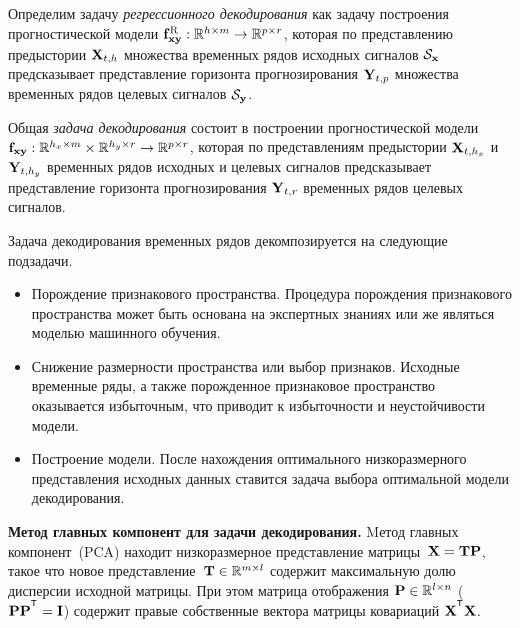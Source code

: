 \documentclass[11pt, a5paper]{dissert}
\begin{document}
\begin{definition}
	\label{ch1:def:reg_model}
	Определим задачу \textit{регрессионного декодирования} как задачу построения прогностической модели $\mathbf{f}^{\text{R}}_{\mathbf{x}\mathbf{y}}: \mathbb{R}^{h \times m} \rightarrow \mathbb{R}^{p \times r}$, которая по представлению предыстории $\mathbf{X}_{t,h}$ множества временных рядов исходных сигналов $\mathcal{S}_{\mathbf{x}}$ предсказывает представление горизонта прогнозирования $\mathbf{Y}_{t,p}$ множества временных рядов целевых сигналов $\mathcal{S}_{\mathbf{y}}$.
\end{definition}

\begin{definition}
	\label{ch1:def:decode_model}
	Общая \textit{задача декодирования} состоит в построении прогностической модели $\mathbf{f}_{\mathbf{x}\mathbf{y}}: \mathbb{R}^{h_x \times m} \times \mathbb{R}^{h_y \times r} \rightarrow \mathbb{R}^{p \times r}$, которая по представлениям предыстории $\mathbf{X}_{t,h_x}$ и $\mathbf{Y}_{t,h_y}$ временных рядов исходных и целевых сигналов предсказывает представление горизонта прогнозирования $\mathbf{Y}_{t,r}$ временных рядов целевых сигналов. 
\end{definition}

Задача декодирования временных рядов декомпозируется на следующие подзадачи.
\begin{itemize}
	\item Порождение признакового пространства.  
	Процедура порождения признакового пространства может быть основана на экспертных знаниях или же являться моделью машинного обучения. 
	
	\item Снижение размерности пространства или выбор признаков. 
	Исходные временные ряды, а также порожденное признаковое пространство оказывается избыточным, что приводит к избыточности и неустойчивости модели. 
	
	\item Построение модели.
	После нахождения оптимального низкоразмерного представления исходных данных ставится задача выбора оптимальной модели декодирования.
\end{itemize}

\vspace{0.5cm}
\textbf{Метод главных компонент для задачи декодирования.}
Mетод главных компонент~(PCA) находит низкоразмерное представление матрицы~$\mathbf{X} = \mathbf{T} \mathbf{P}$, такое что новое представление~$\mathbf{T} \in \mathbb{R}^{m \times l}$ содержит максимальную долю дисперсии исходной матрицы.
При этом матрица отображения $\mathbf{P} \in \mathbb{R}^{l \times n}$ ($\bP \bP^{\T} = \bI$) содержит правые собственные вектора матрицы ковариаций $\bX^{\T} \bX$.
\end{document}
